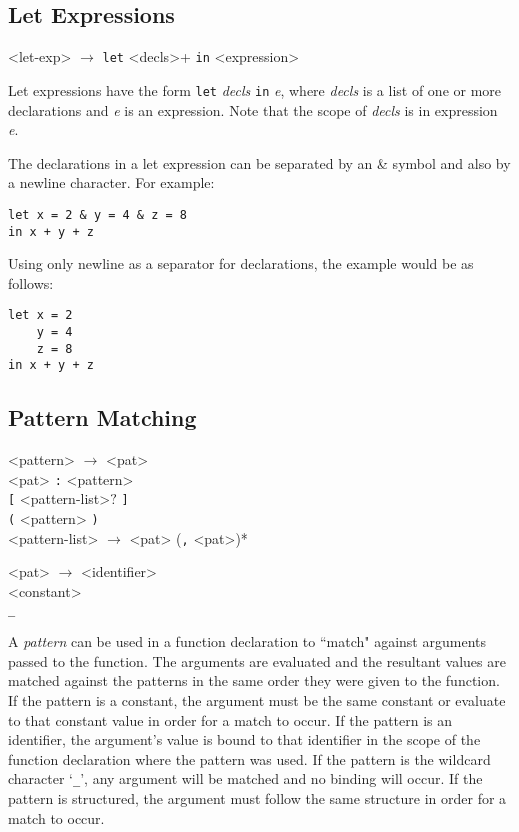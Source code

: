 \subsection{Let Expressions}
\begin{grammar}
<let-exp> $\rightarrow$ \texttt{let} <decls>+ \texttt{in} <expression>
\end{grammar}
Let expressions have the form \texttt{let} \emph{decls} \texttt{in} \emph{e}, where \emph{decls} is a list of one or more declarations and \emph{e} is an expression. Note that the scope of \emph{decls} is in expression \emph{e}. 

The declarations in a let expression can be separated by an \& symbol and also by a newline character. For example:

\begin{verbatim}
let x = 2 & y = 4 & z = 8 
in x + y + z
\end{verbatim}
Using only newline as a separator for declarations, the example would be as follows:

\begin{verbatim}
let x = 2
    y = 4
    z = 8
in x + y + z
\end{verbatim}

\subsection{Pattern Matching}

\setlength{\grammarindent}{5em}
\begin{grammar}
<pattern> $\rightarrow$ <pat> \\ <pat> \texttt{:} <pattern> \\ \texttt{[} <pattern-list>$?$ \texttt{]} \\
												\texttt{(} <pattern> \texttt{)} \\


<pattern-list> $\rightarrow$ <pat> (\texttt{,} <pat>)* 

<pat> $\rightarrow$ <identifier> \\ <constant> \\ \texttt{_}
												
\end{grammar}

A \emph{pattern} can be used in a function declaration to ``match" against arguments passed to the function. The
arguments are evaluated and the resultant values are matched against the patterns in the same order they were given
to the function. If the pattern
is a constant, the argument must be the same constant or evaluate to that constant value in order for a match to
occur. If the pattern is an identifier, the argument's value is bound to that identifier in the scope of the
function declaration where the pattern was used. If the pattern is the wildcard character `\texttt{_}', 
any argument will be matched and no binding will occur. If the pattern is structured, the argument must follow
the same structure in order for a match to occur. 

